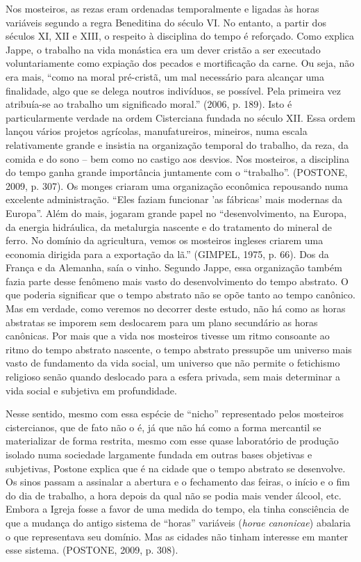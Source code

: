 Nos mosteiros, as rezas eram ordenadas temporalmente e ligadas às horas
variáveis segundo a regra Beneditina do século VI. No entanto, a partir
dos séculos XI, XII e XIII, o respeito à disciplina do tempo é
reforçado. Como explica Jappe, o trabalho na vida monástica era um dever
cristão a ser executado voluntariamente como expiação dos pecados e
mortificação da carne. Ou seja, não era mais, ``como na moral
pré-cristã, um mal necessário para alcançar uma finalidade, algo que se
delega noutros indivíduos, se possível. Pela primeira vez atribuía-se ao
trabalho um significado moral.'' (2006, p. 189). Isto é particularmente
verdade na ordem Cisterciana fundada no século XII. Essa ordem lançou
vários projetos agrícolas, manufatureiros, mineiros, numa escala
relativamente grande e insistia na organização temporal do trabalho, da
reza, da comida e do sono -- bem como no castigo aos desvios. Nos
mosteiros, a disciplina do tempo ganha grande importância juntamente com
o ``trabalho''. (POSTONE, 2009, p. 307). Os monges criaram uma
organização econômica repousando numa excelente administração. ``Eles
faziam funcionar 'as fábricas' mais modernas da Europa''. Além do mais,
jogaram grande papel no ``desenvolvimento, na Europa, da energia
hidráulica, da metalurgia nascente e do tratamento do mineral de ferro.
No domínio da agricultura, vemos os mosteiros ingleses criarem uma
economia dirigida para a exportação da lã.'' (GIMPEL, 1975, p. 66). Dos
da França e da Alemanha, saía o vinho. Segundo Jappe, essa organização
também fazia parte desse fenômeno mais vasto do desenvolvimento do tempo
abstrato. O que poderia significar que o tempo abstrato não se opõe
tanto ao tempo canônico. Mas em verdade, como veremos no decorrer deste
estudo, não há como as horas abstratas se imporem sem deslocarem para um
plano secundário as horas canônicas. Por mais que a vida nos mosteiros
tivesse um ritmo consoante ao ritmo do tempo abstrato nascente, o tempo
abstrato pressupõe um universo mais vasto de fundamento da vida social,
um universo que não permite o fetichismo religioso senão quando
deslocado para a esfera privada, sem mais determinar a vida social e
subjetiva em profundidade.

Nesse sentido, mesmo com essa espécie de ``nicho'' representado pelos
mosteiros cistercianos, que de fato não o é, já que não há como a forma
mercantil se materializar de forma restrita, mesmo com esse quase
laboratório de produção isolado numa sociedade largamente fundada em
outras bases objetivas e subjetivas, Postone explica que é na cidade que
o tempo abstrato se desenvolve. Os sinos passam a assinalar a abertura e
o fechamento das feiras, o início e o fim do dia de trabalho, a hora
depois da qual não se podia mais vender álcool, etc. Embora a Igreja
fosse a favor de uma medida do tempo, ela tinha consciência de que a
mudança do antigo sistema de ``horas'' variáveis (\emph{horae}
\emph{canonicae}) abalaria o que representava seu domínio. Mas as
cidades não tinham interesse em manter esse sistema. (POSTONE, 2009, p.
308).

